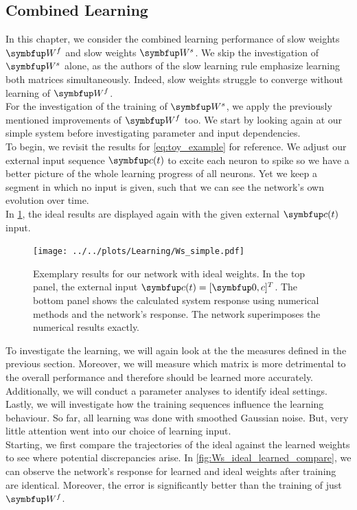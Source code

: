 \subsection{Combined Learning}\label{ssec:combined_learning}
In this chapter, we consider the combined learning performance of slow weights $\bmu{W}^f$ and slow weights $\bmu{W}^s$. We skip the investigation of $\bmu{W}^s$ alone, as the authors of the slow learning rule \cite{bourdoukan_enforcing_2015} emphasize learning both matrices simultaneously. Indeed, slow weights struggle to converge without learning of $\bmu{W}^f$.\\
For the investigation of the training of $\bmu{W}^s$, we apply the previously mentioned improvements of $\bmu{W}^f$ too. We start by looking again at our simple system before investigating parameter and input dependencies.\\
To begin, we revisit the results for \cref{eq:toy_example} for reference. We adjust our external input sequence $\bmu{c}(t)$ to excite each neuron to spike so we have a better picture of the whole learning progress of all neurons. Yet we keep a segment in which no input is given, such that we can see the network's own evolution over time.\\
In \cref{fig:Ws_intro}, the ideal results are displayed again with the given external $\bmu{c}(t)$ input.
\begin{figure}
	\centering
	\texttt{[image: ../../plots/Learning/Ws\_simple.pdf]}
	\caption{Exemplary results for our network with ideal weights. In the top panel, the external input $\bmu{c}(t) = [\bmu{0},c]^T$. The bottom panel shows the calculated system response using numerical methods and the network's response. The network superimposes the numerical results exactly.}
	\label{fig:Ws_intro}
\end{figure}
To investigate the learning, we will again look at the the measures defined in the previous section. Moreover, we will measure which matrix is more detrimental to the overall performance and therefore should be learned more accurately. Additionally, we will conduct a parameter analyses to identify ideal settings. Lastly, we will investigate how the training sequences influence the learning behaviour. So far, all learning was done with smoothed Gaussian noise. But, very little attention went into our choice of learning input.\\
Starting, we first compare the trajectories of the ideal against the learned weights to see where potential discrepancies arise. In \cref{fig:Ws_ideal_learned_compare}, we can observe the network's response for learned and ideal weights after training are identical. Moreover, the error is significantly better than the training of just $\bmu{W}^f$.
